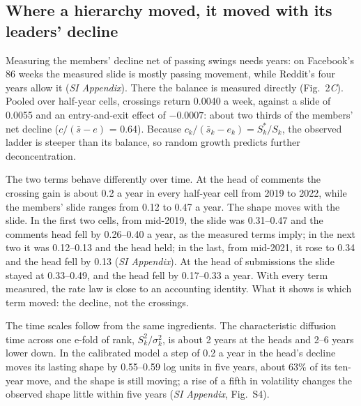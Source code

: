 \documentclass[9pt,twocolumn,twoside]{pnas-new}
\begin{document}
\subsection*{Where a hierarchy moved, it moved with its leaders' decline}
Measuring the members' decline net of passing swings needs years: on Facebook's 86 weeks the measured slide is mostly passing movement, while Reddit's four years allow it (\textit{SI Appendix}). There the balance is measured directly (Fig.~2\textit{C}). Pooled over half-year cells, crossings return 0.0040 a week, against a slide of 0.0055 and an entry-and-exit effect of $-0.0007$: about two thirds of the members' net decline ($c/(\bar s - e)$ = 0.64). Because $c_k/(\bar s_k - e_k) = S^\ast_k/S_k$, the observed ladder is steeper than its balance, so random growth predicts further deconcentration.

The two terms behave differently over time. At the head of comments the crossing gain is about 0.2 a year in every half-year cell from 2019 to 2022, while the members' slide ranges from 0.12 to 0.47 a year. The shape moves with the slide. In the first two cells, from mid-2019, the slide was 0.31--0.47 and the comments head fell by 0.26--0.40 a year, as the measured terms imply; in the next two it was 0.12--0.13 and the head held; in the last, from mid-2021, it rose to 0.34 and the head fell by 0.13 (\textit{SI Appendix}). At the head of submissions the slide stayed at 0.33--0.49, and the head fell by 0.17--0.33 a year. With every term measured, the rate law is close to an accounting identity. What it shows is which term moved: the decline, not the crossings.

The time scales follow from the same ingredients. The characteristic diffusion time across one e-fold of rank, $S_k^2/\sigma_k^2$, is about 2 years at the heads and 2--6 years lower down. In the calibrated model a step of 0.2 a year in the head's decline moves its lasting shape by 0.55--0.59 log units in five years, about 63\% of its ten-year move, and the shape is still moving; a rise of a fifth in volatility changes the observed shape little within five years (\textit{SI Appendix}, Fig.~S4).
\end{document}
